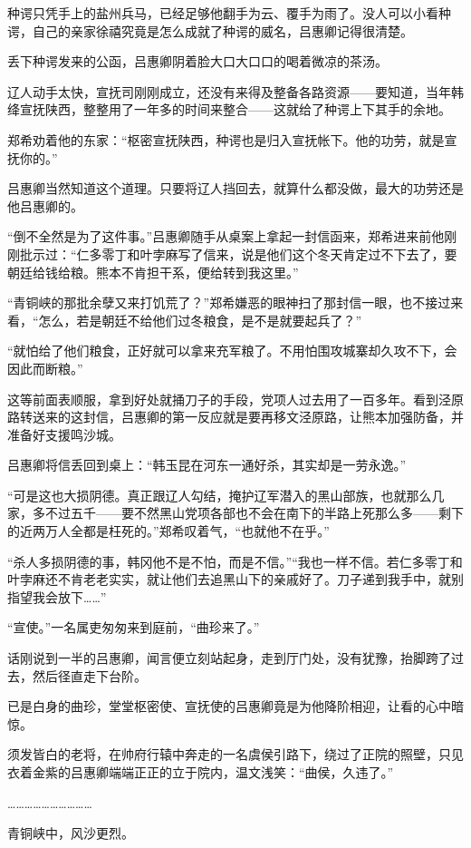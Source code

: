 种谔只凭手上的盐州兵马，已经足够他翻手为云、覆手为雨了。没人可以小看种谔，自己的亲家徐禧究竟是怎么成就了种谔的威名，吕惠卿记得很清楚。

丢下种谔发来的公函，吕惠卿阴着脸大口大口口的喝着微凉的茶汤。

辽人动手太快，宣抚司刚刚成立，还没有来得及整备各路资源——要知道，当年韩绛宣抚陕西，整整用了一年多的时间来整合——这就给了种谔上下其手的余地。

郑希劝着他的东家：“枢密宣抚陕西，种谔也是归入宣抚帐下。他的功劳，就是宣抚你的。”

吕惠卿当然知道这个道理。只要将辽人挡回去，就算什么都没做，最大的功劳还是他吕惠卿的。

“倒不全然是为了这件事。”吕惠卿随手从桌案上拿起一封信函来，郑希进来前他刚刚批示过：“仁多零丁和叶孛麻写了信来，说是他们这个冬天肯定过不下去了，要朝廷给钱给粮。熊本不肯担干系，便给转到我这里。”

“青铜峡的那批余孽又来打饥荒了？”郑希嫌恶的眼神扫了那封信一眼，也不接过来看，“怎么，若是朝廷不给他们过冬粮食，是不是就要起兵了？”

“就怕给了他们粮食，正好就可以拿来充军粮了。不用怕围攻城寨却久攻不下，会因此而断粮。”

这等前面表顺服，拿到好处就捅刀子的手段，党项人过去用了一百多年。看到泾原路转送来的这封信，吕惠卿的第一反应就是要再移文泾原路，让熊本加强防备，并准备好支援鸣沙城。

吕惠卿将信丢回到桌上：“韩玉昆在河东一通好杀，其实却是一劳永逸。”

“可是这也大损阴德。真正跟辽人勾结，掩护辽军潜入的黑山部族，也就那么几家，多不过五千——要不然黑山党项各部也不会在南下的半路上死那么多——剩下的近两万人全都是枉死的。”郑希叹着气，“也就他不在乎。”

“杀人多损阴德的事，韩冈他不是不怕，而是不信。”“我也一样不信。若仁多零丁和叶孛麻还不肯老老实实，就让他们去追黑山下的亲戚好了。刀子递到我手中，就别指望我会放下……”

“宣使。”一名属吏匆匆来到庭前，“曲珍来了。”

话刚说到一半的吕惠卿，闻言便立刻站起身，走到厅门处，没有犹豫，抬脚跨了过去，然后径直走下台阶。

已是白身的曲珍，堂堂枢密使、宣抚使的吕惠卿竟是为他降阶相迎，让看的心中暗惊。

须发皆白的老将，在帅府行辕中奔走的一名虞侯引路下，绕过了正院的照壁，只见衣着金紫的吕惠卿端端正正的立于院内，温文浅笑：“曲侯，久违了。”

…………………………

青铜峡中，风沙更烈。

